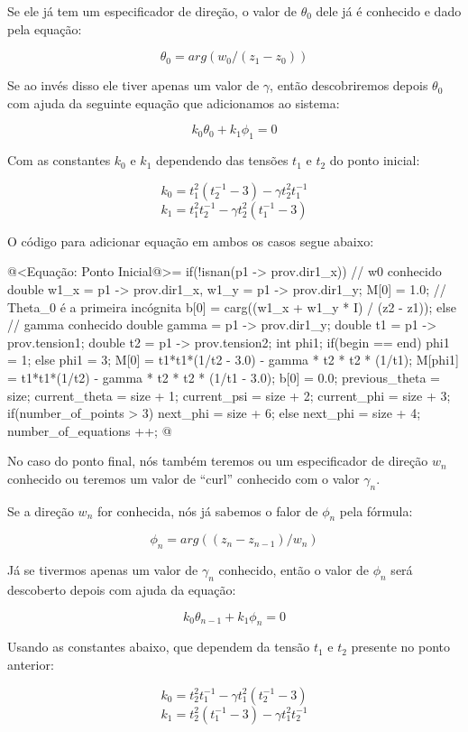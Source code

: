 Se ele já tem um especificador de direção, o valor de $\theta_0$ dele
já é conhecido e dado pela equação:

$$
\theta_0 = arg(w_0/(z_1-z_0))
$$

Se ao invés disso ele tiver apenas um valor de $\gamma$, então
descobriremos depois $\theta_0$ com ajuda da seguinte equação que
adicionamos ao sistema:

$$
k_0\theta_0+k_1\phi_1=0
$$

Com as constantes $k_0$ e $k_1$ dependendo das tensões $t_1$ e
$t_2$ do ponto inicial:

$$
k_0=t_1^2(t_2^{-1}-3)-\gamma t_2^2t_1^{-1}
$$
$$
k_1=t_1^2t_2^{-1}-\gamma t_2^2(t_1^{-1}-3)
$$

O código para adicionar equação em ambos os casos segue abaixo:

\iniciocodigo
@<Equação: Ponto Inicial@>=
if(!isnan(p1 -> prov.dir1_x)){ // w0 conhecido
  double w1_x = p1 -> prov.dir1_x, w1_y = p1 -> prov.dir1_y;
  M[0] = 1.0; // Theta_0 é a primeira incógnita
  b[0] = carg((w1_x + w1_y * I) / (z2 - z1));
}
else{ // gamma conhecido
  double gamma = p1 -> prov.dir1_y;
  double t1 = p1 -> prov.tension1;
  double t2 = p1 -> prov.tension2;
  int phi1;
  if(begin == end)
    phi1 = 1;
  else
    phi1 = 3;
  M[0] = t1*t1*(1/t2 - 3.0) - gamma * t2 * t2 * (1/t1);
  M[phi1] = t1*t1*(1/t2) - gamma * t2 * t2 * (1/t1 - 3.0);
  b[0] = 0.0;
}
{
  previous_theta = size;
  current_theta = size + 1;
  current_psi = size + 2;
  current_phi = size + 3;
  if(number_of_points > 3)
    next_phi = size + 6;
  else
    next_phi = size + 4;
  number_of_equations ++;
}
@
\fimcodigo

No caso do ponto final, nós também teremos ou um especificador de
direção $w_n$ conhecido ou teremos um valor de ``curl'' conhecido com
o valor $\gamma_n$.

Se a direção $w_n$ for conhecida, nós já sabemos o falor de $\phi_n$
pela fórmula:

$$
\phi_n = arg((z_n - z_{n-1})/w_n)
$$

Já se tivermos apenas um valor de $\gamma_n$ conhecido, então o valor
de $\phi_n$ será descoberto depois com ajuda da equação:

$$
k_0\theta_{n-1}+k_1\phi_{n}=0
$$

Usando as constantes abaixo, que dependem da tensão $t_1$ e $t_2$
presente no ponto anterior:

$$
k_0=t_2^2t_1^{-1}-\gamma t_1^2(t_2^{-1}-3)
$$
$$
k_1=t_2^2(t_1^{-1}-3)-\gamma t_1^2t_2^{-1}
$$

